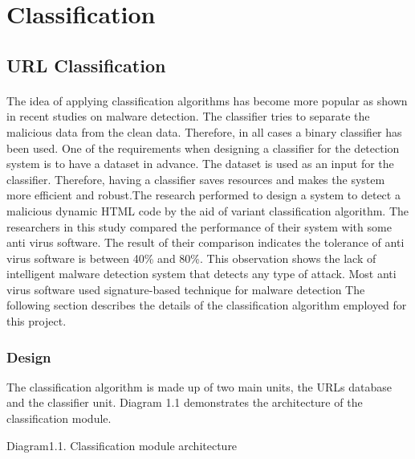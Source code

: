\section{Classification}

\subsection{URL Classification}

\paragraph{} 
The idea of applying classification algorithms has become more popular as shown in recent studies on malware detection. The classifier tries to separate the malicious data from the clean data. Therefore, in all cases a binary classifier has been used. One of the requirements when designing a classifier for the detection system is to have a dataset in advance. The dataset is used as an input for the classifier. Therefore, having a classifier saves resources and makes the system more efficient and robust.The research performed to design a system to detect a malicious dynamic HTML code by the aid of variant classification algorithm. The researchers in this study compared the performance of their system with some anti virus software. The result of their comparison indicates the tolerance of anti virus software is between 40\% and 80\%. This observation shows the lack of intelligent malware detection system that detects any type of attack. Most anti virus software used signature-based technique for malware detection\cite{Macilious-weblearning}  
 The following section describes the details of the classification algorithm employed for this project. 
\subsubsection{Design}
The classification algorithm is made up of two main units, the URLs database and the classifier unit. Diagram 1.1 demonstrates the architecture of the classification module.



Diagram1.1. Classification module architecture

